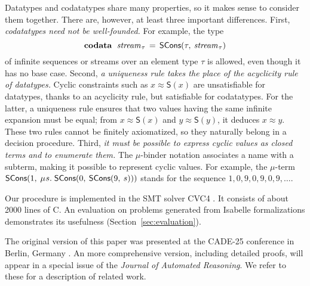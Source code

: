 \documentclass[letter]{article}
\newcommand\MU{\vvthinspace\mu\vvthinspace}
\theoremstyle{definition}
\newcommand\cpp{C\nobreak\raisebox{.05ex}{+}\nobreak\raisebox{.05ex}{+}}
\newcommand\keyw[1]{\textbf{#1}}
\newcommand\const[1]{\textsf{#1}}
\newcommand\ty[1]{\textit{#1}}
\newcommand{\teq}{\approx}
\newcommand\vvthinspace{\kern+0.041667em}
\newcommand\vthinspace{\kern+0.083333em}
\begin{document}
Datatypes and codatatypes share many properties, so it makes sense
to consider them together. There are, however, at least three important
differences.
%
First, \emph{codatatypes need not be well-founded.}
For example, the type
$$\vthinspace\keyw{codata}~\;\ty{stream}_{\vthinspace\tau} \,=\allowbreak\, \const{SCons}(\tau,\allowbreak\: \ty{stream}_{\vthinspace\tau})\vthinspace$$
of infinite sequences or streams over an element type $\tau$ is
allowed, even though it has no base case.
Second, \emph{a uniqueness rule takes the place of the acyclicity rule of datatypes.}
Cyclic constraints such as
$x \teq \const{S}(x)$ %
are unsatisfiable for datatypes,
thanks to an acyclicity rule,
but satisfiable for codatatypes. 
For the latter, a uniqueness rule ensures that two values
having the same infinite expansion must be equal; from $x
\teq \const{S}(x)$ and
$y \teq \const{S}(y)$, it deduces $x \teq y$.
These two rules cannot be finitely axiomatized, so they naturally belong in
a decision procedure.
%
Third, \emph{it must be possible to express cyclic values as closed terms and
to enumerate them.} %
The \hbox{$\mu$-binder} notation associates a name with
a subterm, making it possible to represent cyclic values.
For example,
the $\mu$-term $\const{SCons}(1,\: \MU s.\; \const{SCons}(0,\: \const{SCons}(9,\: s)))$
stands for the %
sequence $1, 0, 9, 0, 9, 0, 9, \dotsc$.


Our procedure is implemented in the SMT solver CVC4 \cite{barrett-et-al-2011}. 
It consists of about 2000 lines of \cpp{}. %
%
An evaluation on %
problems generated from Isabelle
formalizations demonstrates its usefulness (Section~\ref{sec:evaluation}).

The original version of this paper was presented at the CADE-25 conference in
Berlin, Germany \cite{reynolds-blanchette-2015-codata}. An more comprehensive
version, including detailed proofs, will appear in a special issue of the
\emph{Journal of Automated Reasoning}. We refer to these for a description of
related work.
\end{document}
